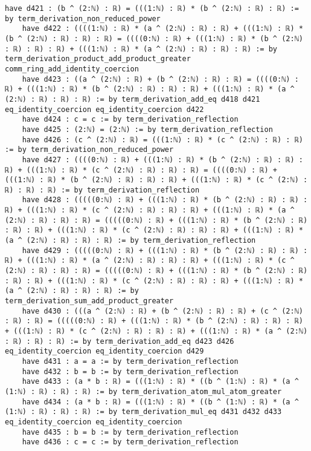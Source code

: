\documentclass{article}
\begin{document}
\begin{tcolorbox}[colback=white!10, width=\linewidth]
\begin{lstlisting}[language=Lean4]
    have d421 : (b ^ (2:ℕ) : ℝ) = (((1:ℕ) : ℝ) * (b ^ (2:ℕ) : ℝ) : ℝ) := by term_derivation_non_reduced_power
    have d422 : ((((1:ℕ) : ℝ) * (a ^ (2:ℕ) : ℝ) : ℝ) + (((1:ℕ) : ℝ) * (b ^ (2:ℕ) : ℝ) : ℝ) : ℝ) = ((((0:ℕ) : ℝ) + (((1:ℕ) : ℝ) * (b ^ (2:ℕ) : ℝ) : ℝ) : ℝ) + (((1:ℕ) : ℝ) * (a ^ (2:ℕ) : ℝ) : ℝ) : ℝ) := by term_derivation_product_add_product_greater comm_ring_add_identity_coercion
    have d423 : ((a ^ (2:ℕ) : ℝ) + (b ^ (2:ℕ) : ℝ) : ℝ) = ((((0:ℕ) : ℝ) + (((1:ℕ) : ℝ) * (b ^ (2:ℕ) : ℝ) : ℝ) : ℝ) + (((1:ℕ) : ℝ) * (a ^ (2:ℕ) : ℝ) : ℝ) : ℝ) := by term_derivation_add_eq d418 d421 eq_identity_coercion eq_identity_coercion d422
    have d424 : c = c := by term_derivation_reflection
    have d425 : (2:ℕ) = (2:ℕ) := by term_derivation_reflection
    have d426 : (c ^ (2:ℕ) : ℝ) = (((1:ℕ) : ℝ) * (c ^ (2:ℕ) : ℝ) : ℝ) := by term_derivation_non_reduced_power
    have d427 : ((((0:ℕ) : ℝ) + (((1:ℕ) : ℝ) * (b ^ (2:ℕ) : ℝ) : ℝ) : ℝ) + (((1:ℕ) : ℝ) * (c ^ (2:ℕ) : ℝ) : ℝ) : ℝ) = ((((0:ℕ) : ℝ) + (((1:ℕ) : ℝ) * (b ^ (2:ℕ) : ℝ) : ℝ) : ℝ) + (((1:ℕ) : ℝ) * (c ^ (2:ℕ) : ℝ) : ℝ) : ℝ) := by term_derivation_reflection
    have d428 : (((((0:ℕ) : ℝ) + (((1:ℕ) : ℝ) * (b ^ (2:ℕ) : ℝ) : ℝ) : ℝ) + (((1:ℕ) : ℝ) * (c ^ (2:ℕ) : ℝ) : ℝ) : ℝ) + (((1:ℕ) : ℝ) * (a ^ (2:ℕ) : ℝ) : ℝ) : ℝ) = (((((0:ℕ) : ℝ) + (((1:ℕ) : ℝ) * (b ^ (2:ℕ) : ℝ) : ℝ) : ℝ) + (((1:ℕ) : ℝ) * (c ^ (2:ℕ) : ℝ) : ℝ) : ℝ) + (((1:ℕ) : ℝ) * (a ^ (2:ℕ) : ℝ) : ℝ) : ℝ) := by term_derivation_reflection
    have d429 : (((((0:ℕ) : ℝ) + (((1:ℕ) : ℝ) * (b ^ (2:ℕ) : ℝ) : ℝ) : ℝ) + (((1:ℕ) : ℝ) * (a ^ (2:ℕ) : ℝ) : ℝ) : ℝ) + (((1:ℕ) : ℝ) * (c ^ (2:ℕ) : ℝ) : ℝ) : ℝ) = (((((0:ℕ) : ℝ) + (((1:ℕ) : ℝ) * (b ^ (2:ℕ) : ℝ) : ℝ) : ℝ) + (((1:ℕ) : ℝ) * (c ^ (2:ℕ) : ℝ) : ℝ) : ℝ) + (((1:ℕ) : ℝ) * (a ^ (2:ℕ) : ℝ) : ℝ) : ℝ) := by term_derivation_sum_add_product_greater
    have d430 : (((a ^ (2:ℕ) : ℝ) + (b ^ (2:ℕ) : ℝ) : ℝ) + (c ^ (2:ℕ) : ℝ) : ℝ) = (((((0:ℕ) : ℝ) + (((1:ℕ) : ℝ) * (b ^ (2:ℕ) : ℝ) : ℝ) : ℝ) + (((1:ℕ) : ℝ) * (c ^ (2:ℕ) : ℝ) : ℝ) : ℝ) + (((1:ℕ) : ℝ) * (a ^ (2:ℕ) : ℝ) : ℝ) : ℝ) := by term_derivation_add_eq d423 d426 eq_identity_coercion eq_identity_coercion d429
    have d431 : a = a := by term_derivation_reflection
    have d432 : b = b := by term_derivation_reflection
    have d433 : (a * b : ℝ) = (((1:ℕ) : ℝ) * ((b ^ (1:ℕ) : ℝ) * (a ^ (1:ℕ) : ℝ) : ℝ) : ℝ) := by term_derivation_atom_mul_atom_greater
    have d434 : (a * b : ℝ) = (((1:ℕ) : ℝ) * ((b ^ (1:ℕ) : ℝ) * (a ^ (1:ℕ) : ℝ) : ℝ) : ℝ) := by term_derivation_mul_eq d431 d432 d433 eq_identity_coercion eq_identity_coercion
    have d435 : b = b := by term_derivation_reflection
    have d436 : c = c := by term_derivation_reflection

\end{lstlisting}
\end{tcolorbox}
\end{document}
